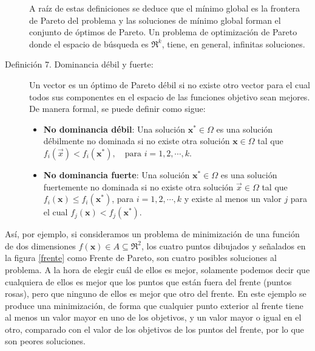\begin{description}
A raíz de estas definiciones se deduce que el mínimo global es la frontera de
Pareto del problema y las soluciones de mínimo global forman el conjunto de óptimos
de Pareto. Un problema de optimización de Pareto donde el espacio de búsqueda es $\Re^k$,
tiene, en general, infinitas soluciones.
\item[Definición 7. Dominancia débil y fuerte:] Un vector es un óptimo de Pareto débil si
no existe otro vector para el cual todos sus componentes en el espacio de las funciones
objetivo sean mejores. De manera formal, se puede definir como sigue:
\begin{itemize}
	\item \textbf{No dominancia débil}: Una solución $\displaystyle \mathbf{x}^* \in
\Omega $
es una solución débilmente no dominada si no existe otra solución $\displaystyle
\mathbf{x}
\in \Omega$ tal que $\displaystyle f_{i}(\vec x) < f_{i}(\mathbf{x}^*), \quad \text{para }
i=1,2,\cdots,k$.
\item \textbf{No dominancia fuerte}: Una solución $\mathbf{x}^* \in \Omega$ es una
solución fuertemente no dominada si no existe otra solución $\vec x \in \Omega $ tal que
$f_{i}(\mathbf{x}) \leq f_{i}(\mathbf{x}^*)$, para $i= 1,2,\cdots, k$ y existe al menos un
valor
$j$ para el cual $f_{j}(\mathbf{x}) < f_{j}(\mathbf{x}^*)$.
\end{itemize}
\end{description}

Así, por ejemplo, si consideramos un problema de minimización de una función de dos dimensiones
$\displaystyle f(\mathbf{x}) \in A \subseteq \Re^2$, los cuatro puntos dibujados y
señalados en la figura \ref{frente} como Frente de Pareto, son cuatro posibles soluciones al
problema. A la
hora de elegir cuál de ellos es mejor, solamente podemos decir que cualquiera de ellos es
mejor que los puntos que están fuera del frente (puntos rosas), pero que ninguno de ellos
es mejor que otro del frente. En este ejemplo se produce una minimización, de forma que
cualquier punto exterior al frente tiene al menos un valor mayor en uno de los
objetivos, y un valor mayor o igual en el otro, comparado con el valor de los
objetivos de los puntos del frente, por lo que son peores soluciones.

